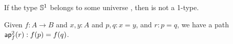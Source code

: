 \documentclass[hott-all.tex]{subfiles}
\begin{document}
% 
% 
\begin{cor}
  If the type $\mathbb{S}^1$ belongs to some universe \type, then \type is not a 1-type.
\end{cor}
% 
% 
% 
\begin{lem}
  Given $f:A\to B$ and $x,y:A$ and $p,q:x=y$, and $r:p=q$, we have a path $\mathsf{ap}^2_{f}\mathopen{}\left({r}\right)\mathclose{} : {f}\mathopen{}\left({p}\right)\mathclose{} = {f}\mathopen{}\left({q}\right)\mathclose{}$.
\end{lem}
\end{document}
